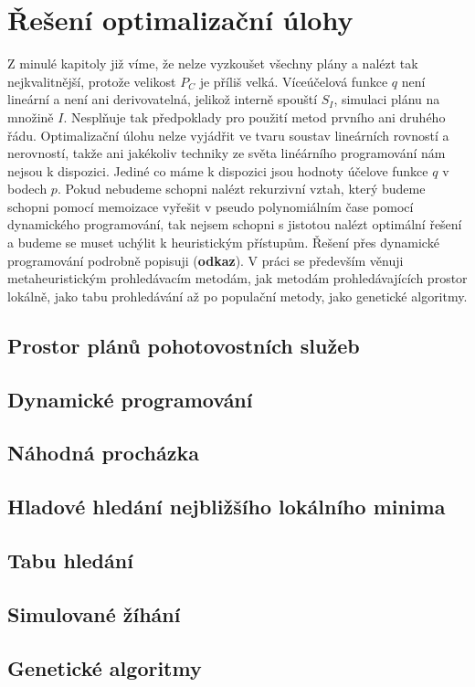 \chapter{Řešení optimalizační úlohy}

Z minulé kapitoly již víme, že nelze vyzkoušet všechny plány a nalézt tak nejkvalitnější, protože velikost $P_C$ je příliš velká.
Víceúčelová funkce $q$ není lineární a není ani derivovatelná, jelikož interně spouští $S_I$, simulaci plánu na množině $I$.
Nesplňuje tak předpoklady pro použití metod prvního ani druhého řádu.
Optimalizační úlohu nelze vyjádřit ve tvaru soustav lineárních rovností a nerovností, takže ani jakékoliv techniky ze světa linéárního programování nám nejsou k dispozici.
Jediné co máme k dispozici jsou hodnoty účelove funkce $q$ v bodech $p$.
Pokud nebudeme schopni nalézt rekurzivní vztah, který budeme schopni pomocí memoizace vyřešit v pseudo polynomiálním čase pomocí dynamického programování, tak nejsem schopni
s jistotou nalézt optimální řešení a budeme se muset uchýlit k heuristickým přístupům.
Řešení přes dynamické programování podrobně popisuji (\textbf{odkaz}).
V práci se především věnuji metaheuristickým prohledávacím metodám, %
jak metodám prohledávajících prostor lokálně, jako tabu prohledávání až po populační metody, jako genetické algoritmy.

\section{Prostor plánů pohotovostních služeb}

\section{Dynamické programování}

\section{Náhodná procházka}

\section{Hladové hledání nejbližšího lokálního minima}

\section{Tabu hledání}

\section{Simulované žíhání}

\section{Genetické algoritmy}


